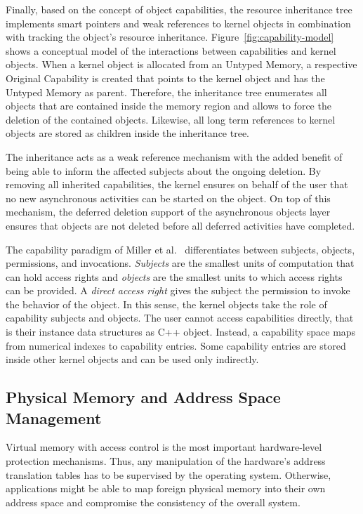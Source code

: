 Finally, based on the concept of object capabilities, the resource inheritance tree implements smart pointers and weak references to kernel objects in combination with tracking the object's resource inheritance.  Figure~\ref{fig:capability-model} shows a conceptual model of the interactions between capabilities and kernel objects. When a kernel object is allocated from an Untyped Memory, a respective Original Capability is created that points to the kernel object and has the Untyped Memory as parent. Therefore, the inheritance tree enumerates all objects that are contained inside the memory region and allows to force the deletion of the contained objects. Likewise, all long term references to kernel objects are stored as children inside the inheritance tree.  

The inheritance acts as a weak reference mechanism with the added benefit of being able to inform the affected subjects about the ongoing deletion. By removing all inherited capabilities, the kernel ensures on behalf of the user that no new asynchronous activities can be started on the object. On top of this mechanism, the deferred deletion support of the asynchronous objects layer ensures that objects are not deleted before all deferred activities have completed.

The capability paradigm of Miller et al.~\cite{Miller2005} differentiates between subjects, objects, permissions, and invocations. 
\emph{Subjects} are the smallest units of computation that can hold access rights and \emph{objects} are the smallest units to which access rights can be provided. 
A \emph{direct access right} gives the subject the permission to invoke the behavior of the object.
In this sense, the kernel objects take the role of capability subjects and objects. 
The user cannot access capabilities directly, that is their instance data structures as C++ object. Instead, a capability space maps from numerical indexes to capability entries. Some capability entries are stored inside other kernel objects and can be used only indirectly. 

\subsection{Physical Memory and Address Space Management}
\label{sec:memory-impl}

Virtual memory with access control is the most important hardware-level protection mechanisms. Thus, any manipulation of the hardware's address translation tables has to be supervised by the operating system. Otherwise, applications might be able to map foreign physical memory into their own address space and compromise the consistency of the overall system. 

